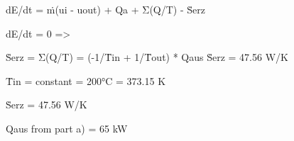 dE/dt = ṁ(ui - uout) + Qa  
+ Σ(Q/T) - Ṡerz  

dE/dt = 0 =>  

Ṡerz = Σ(Q/T) = (-1/T̄in + 1/T̄out) * Qaus  
Ṡerz = 47.56 W/K  

T̄in = constant = 200°C = 373.15 K  

Ṡerz = 47.56 W/K  

Qaus from part a) = 65 kW